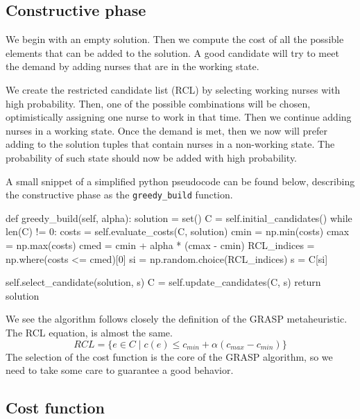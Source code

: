 \documentclass[12pt,a4paper]{article}
\begin{document}
%
\subsection{Constructive phase}
%
We begin with an empty solution. Then we compute the cost of all the possible 
elements that can be added to the solution. A good candidate will try to meet 
the demand by adding nurses that are in the working state.

We create the restricted candidate list (RCL) by selecting working nurses with 
high probability. Then, one of the possible combinations will be chosen, 
optimistically assigning one nurse to work in that time.  Then we continue 
adding nurses in a working state.  Once the demand is met, then we now will 
prefer adding to the solution tuples that contain nurses in a non-working state.  
The probability of such state should now be added with high probability.

A small snippet of a simplified python pseudocode can be found below, describing 
the constructive phase as the \texttt{greedy\_build} function.
%
\begin{pycode}
def greedy_build(self, alpha):
	solution = set()
	C = self.initial_candidates()
	while len(C) != 0:
		costs = self.evaluate_costs(C, solution)
		cmin = np.min(costs)
		cmax = np.max(costs)
		cmed = cmin + alpha * (cmax - cmin)
		RCL_indices = np.where(costs <= cmed)[0]
		si = np.random.choice(RCL_indices)
		s = C[si]

		self.select_candidate(solution, s)
		C = self.update_candidates(C, s)
	return solution
\end{pycode}
%
We see the algorithm follows closely the definition of the GRASP metaheuristic.  
The RCL equation, is almost the same.
$$
	RCL = \{e \in C \mid c(e) \le c_{min} + \alpha (c_{max} - c_{min})\}
$$
The selection of the cost function is the core of the GRASP algorithm, so we
need to take some care to guarantee a good behavior.

\subsection{Cost function}
\end{document}
